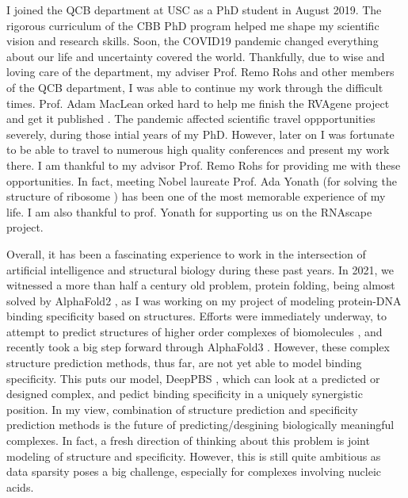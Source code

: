 
I joined the QCB department at USC as a PhD student in August 2019. The rigorous curriculum of the CBB PhD program helped me shape my scientific vision and research skills. Soon, the COVID19 pandemic changed everything about our life and uncertainty covered the world. Thankfully, due to wise and loving care of the department, my adviser Prof. Remo Rohs and other members of the QCB department, I was able to continue my work through the difficult times. Prof. Adam MacLean orked hard to help me finish the RVAgene project and get it published \citep{Mitra2021}. The pandemic affected scientific travel oppportunities severely, during those intial years of my PhD. However, later on I was fortunate to be able to travel to numerous high quality conferences and present my work there. I am thankful to my advisor Prof. Remo Rohs for providing me with these opportunities. In fact, meeting Nobel laureate Prof. Ada Yonath (for solving the structure of ribosome \citep{schluenzen2000structure, harms2001high}) has been one of the most memorable experience of my life. I am also thankful to prof. Yonath for supporting us on the RNAscape project. 


Overall, it has been a fascinating experience to work in the intersection of artificial intelligence and structural biology during these past years. In 2021, we witnessed a more than half a century old problem, protein folding, being almost solved by AlphaFold2 \citep{Jumper2021}, as I was working on my project of modeling protein-DNA binding specificity based on structures. Efforts were immediately underway, to attempt to predict structures of higher order complexes of biomolecules \citep{evans2021protein,baek2024na}, and recently took a big step forward through AlphaFold3 \citep{Abramson2024}. However, these complex structure prediction methods, thus far, are not yet able to model binding specificity. This puts our model, DeepPBS \citep{Mitra2024}, which can look at a predicted or designed complex, and pedict binding specificity in a uniquely synergistic position. In my view, combination of structure prediction and specificity prediction methods is the future of predicting/desgining biologically meaningful complexes. In fact, a fresh direction of thinking about this problem is joint modeling of structure and specificity. However, this is still quite ambitious as data sparsity poses a big challenge, especially for complexes involving nucleic acids. 

